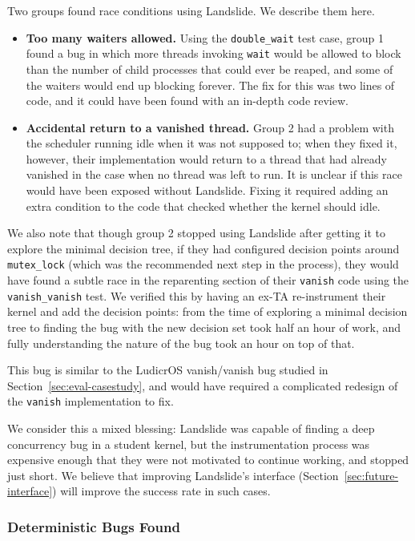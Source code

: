 Two groups found race conditions using Landslide. We describe them here.

\begin{itemize}
	\item {\bf Too many waiters allowed.} Using the \texttt{double\_wait} test case, group 1 found a bug in which more threads invoking \texttt{wait} would be allowed to block than the number of child processes that could ever be reaped, and some of the waiters would end up blocking forever. The fix for this was two lines of code, and it could have been found with an in-depth code review.
	\item {\bf Accidental return to a vanished thread.} Group 2 had a problem with the scheduler running idle when it was not supposed to; when they fixed it, however, their implementation would return to a thread that had already vanished in the case when no thread was left to run. It is unclear if this race would have been exposed without Landslide. Fixing it required adding an extra condition to the code that checked whether the kernel should idle.
\end{itemize}

We also note that though group 2 stopped using Landslide after getting it to explore the minimal decision tree, if they had configured decision points around \texttt{mutex\_lock} (which was the recommended next step in the process), they would have found a subtle race in the reparenting section of their \texttt{vanish} code using the \texttt{vanish\_vanish} test. We verified this by having an ex-TA re-instrument their kernel and add the decision points: from the time of exploring a minimal decision tree to finding the bug with the new decision set took half an hour of work, and fully understanding the nature of the bug took an hour on top of that.

This bug is similar to the LudicrOS vanish/vanish bug studied in Section~\ref{sec:eval-casestudy}, and would have required a complicated redesign of the \texttt{vanish} implementation to fix.

We consider this a mixed blessing: Landslide was capable of finding a deep concurrency bug in a student kernel, but the instrumentation process was expensive enough that they were not motivated to continue working, and stopped just short. We believe that improving Landslide's interface (Section~\ref{sec:future-interface}) will improve the success rate in such cases.

\subsubsection{Deterministic Bugs Found}

